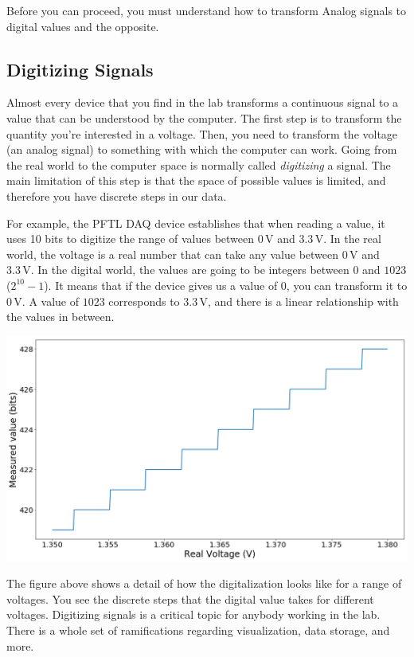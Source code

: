 Before you can proceed, you must understand how to transform Analog signals to digital values and the opposite.

\subsection{Digitizing Signals}\label{subsec:adc-dca}
Almost every device that you find in the lab transforms a continuous signal to a value that can be understood by the computer. The first step is to transform the quantity you're interested in a voltage. Then, you need to transform the voltage (an analog signal) to something with which the computer can work. Going from the real world to the computer space is normally called \emph{digitizing} a signal. The main limitation of this step is that the space of possible values is limited, and therefore you have discrete steps in our data.

For example, the {PFTL DAQ} device establishes that when reading a value, it uses 10 bits to digitize the range of values between $0\,\textrm{V}$ and $3.3\,\textrm{V}$. In the real world, the voltage is a real number that can take any value between $0\,\textrm{V}$ and $3.3\,\textrm{V}$. In the digital world, the values are going to be integers between $0$ and $1023$ ($2^{10}-1$). It means that if the device gives us a value of $0$, you can transform it to $0\,\textrm{V}$. A value of $1023$ corresponds to $3.3\,\textrm{V}$, and there is a linear relationship with the values in between.

\begin{center}
\includegraphics[width=.6\textwidth]{images/Chapter_03/digitalization.png}
\end{center}

The figure above shows a detail of how the digitalization looks like for a range of voltages. You see the discrete steps that the digital value takes for different voltages. Digitizing signals is a critical topic for anybody working in the lab. There is a whole set of ramifications regarding visualization, data storage, and more.

